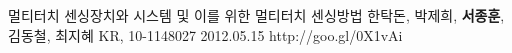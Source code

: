 \begin{cventries}
  \cvpatententry
    {멀티터치 센싱장치와 시스템 및 이를 위한 멀티터치 센싱방법} %
    {한탁돈, 박제희, \textbf{서종훈}, 김동철, 최지혜} %
    {KR, 10-1148027} %
    {2012.05.15} %
    {http://goo.gl/0X1vAi}
\end{cventries}